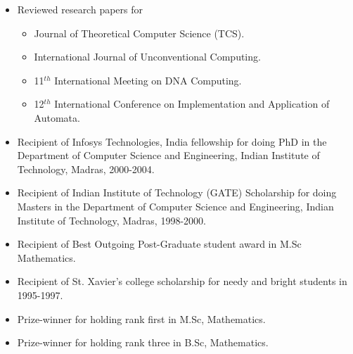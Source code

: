 \documentclass[11pt]{article}
\begin{document}
\begin{itemize}
\item Reviewed research papers for 
\begin{itemize}
\item Journal of Theoretical Computer Science (TCS).
\item International Journal of Unconventional Computing.
\item 11$^{th}$ International Meeting on DNA Computing.
\item 12$^{th}$ International Conference on Implementation and
  Application of Automata. 
\end{itemize}
\item Recipient of Infosys Technologies, India fellowship for doing
PhD in the Department of Computer Science and Engineering, Indian
Institute of Technology, Madras, 2000-2004.
\item Recipient of Indian Institute of Technology (GATE) Scholarship
for doing Masters in the Department of Computer Science and
Engineering, Indian Institute of Technology, Madras, 1998-2000.
\item Recipient of Best Outgoing Post-Graduate student award in M.Sc Mathematics.
\item Recipient of St. Xavier's college scholarship for needy and bright students in 1995-1997.
\item Prize-winner for holding rank first in M.Sc, Mathematics.
\item Prize-winner for holding rank three in B.Sc, Mathematics.
\end{itemize}


\vspace{0.1cm}
\end{document}
